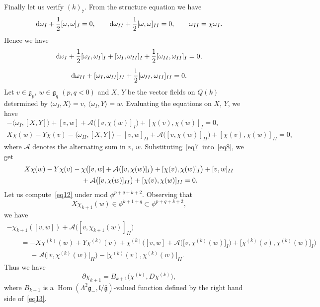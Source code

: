\documentclass[pdftex]{sigma}%
\newcommand{\geneg}{\mathfrak g _-}
\newcommand{\gebar}{\bar{\mathfrak g}}
\newcommand{\g}{\mathfrak g}
\newcommand{\lf}{\mathfrak l}
\newcommand{\Hom}{\operatorname{Hom}}
\numberwithin{equation}{section}
\begin{document}
Finally let us verify $(k)_7$. From the structure equation we have
\begin{gather*}
{\rm d}\omega _I + \frac12 [\omega, \omega]_I = 0, \qquad
{\rm d}\omega _{II} + \frac12 [\omega, \omega]_{II} = 0, \qquad
\omega _{II} = \chi \omega _I.
\end{gather*}
Hence we have
\begin{gather}
{\rm d}\omega _{I} + \frac12 [\omega_{I}, \omega_{I}]_{I} + [\omega_{I}, \omega_{II}]_{I}
+\frac12 [\omega_{II}, \omega_{II}]_{I} = 0,
\\[1ex]
{\rm d}\omega _{II} + [\omega_{I}, \omega_{II}]_{II}
+\frac12 [\omega_{II}, \omega_{II}]_{II} =0.
\end{gather}
Let $v \in \g_p$, $w \in \g_q$ $(p, q < 0 )$ and $X$, $Y$ be the vector fields
on $Q(k)$ determined by $ \langle \omega_I, X\rangle = v$, $\langle \omega _I, Y \rangle = w$.
Evaluating the equations on $X$, $Y$, we have
\begin{gather}
-\langle \omega _I, [X, Y]\rangle + [v, w] + \mathcal A \big([v, \chi(w)]_I \big) + [\chi(v), \chi(w)]_I = 0, \label{eq7}
\\
X\chi(w) - Y \chi(v) - \langle \omega_{II} , [X,Y] \rangle
+[v, w]_{II}+ \mathcal A \big([v, \chi(w) ]_{II}\big) + [\chi (v) , \chi (w ) ] _{II} = 0,\label{eq8}
\end{gather}
where $\mathcal A$ denotes the alternating sum in $v$, $w$.
Substituting~\eqref{eq7} into~\eqref{eq8}, we get
\begin{gather}
X\chi(w) - Y \chi(v) -\chi \big( [v, w] + \mathcal A \big([v, \chi(w) ]_I \big) + [\chi(v), \chi(w)]_I\big)+ [v, w]_{II} \nonumber
\\ \hphantom{X\chi(w) }
{}+ \mathcal A \big([v, \chi(w) ]_{II}\big) +
[\chi (v), \chi (w )]_{II}= 0.\label{eq12}
\end{gather}
Let us compute~\eqref{eq12} under mod $\phi^{p+q+k+2}$.
Observing that
\[
X \chi _{k+1} (w) \in \phi^{k+1+q} \subset \phi^{p+q+k+2},
\]
we have
\begin{gather}
-\chi_{k+1} ( [v, w]) + \mathcal A \big([ v, \chi _{k+1} (w)] _{II} \big)
\nonumber
\\ \qquad
{}= -X\chi^{(k)} (w) + Y \chi ^{(k)}(v)+\chi ^{(k)} \big( [v, w] + \mathcal A \big(\big[v, \chi ^{(k)} (w) \big]_{I}\big) + \big[\chi ^{(k)} (v), \chi ^{(k)} (w)\big]_I\big) \nonumber
\\ \qquad\phantom{=}
{}- \mathcal A \big( \big[v, \chi^ {(k)}(w)\big]_{II} \big)- \big[\chi^{(k)}(v), \chi^{(k)}(w)\big]_{II}.\label{eq13}
\end{gather}
Thus we have
\begin{equation}\label{eq:chi}
\partial \chi _{k+1} = B_{k+1} \big( \chi ^{(k)}, D\chi ^{(k)} \big),
\end{equation}
where $B_{k+1} $ is a $\Hom\left(\Lambda ^2 \geneg , \lf / \gebar \right)$-valued
function defined by the right hand side of~\eqref{eq13}.
\end{document}
